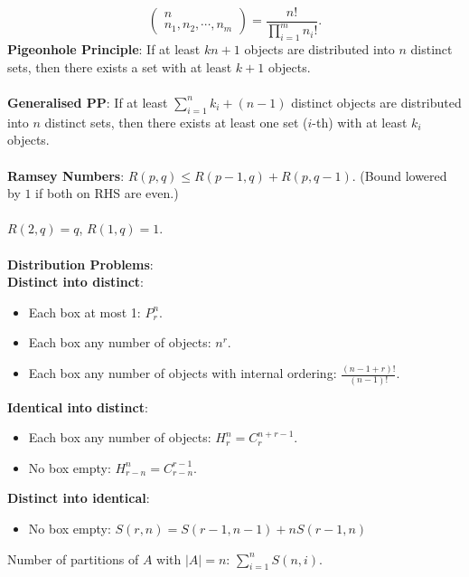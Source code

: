 \documentclass[11pt]{article}
\begin{document}
\begin{multicols*}{3}
\begin{equation*}
\begin{pmatrix}
                n \\
                n_1, n_2, \cdots, n_m
            \end{pmatrix} = \frac{n!}{\prod_{i = 1}^{m}n_i!}.
        \end{equation*}
        \textbf{Pigeonhole Principle}: If at least $kn + 1$ objects are distributed into $n$ distinct sets, then there exists a set with at least $k + 1$ objects.
        \\\\
        \textbf{Generalised PP}: If at least $\sum_{i = 1}^{n}k_i + (n - 1)$ distinct objects are distributed into $n$ distinct sets, then there exists at least one set ($i$-th) with at least $k_i$ objects.
        \\\\
        \textbf{Ramsey Numbers}: $R(p, q) \leq R(p - 1, q) + R(p, q - 1)$. (Bound lowered by $1$ if both on RHS are even.)
        \\\\
        $R(2, q) = q$, $R(1, q) = 1$.
        \\\\
        \textbf{Distribution Problems}:
        \\
        \textbf{Distinct into distinct}:
        \begin{itemize}
            \item Each box at most 1: $P^n_r$.
            \item Each box any number of objects: $n^r$.
            \item Each box any number of objects with internal ordering: $\frac{(n - 1 + r)!}{(n - 1)!}$.
        \end{itemize}
        \textbf{Identical into distinct}: 
        \begin{itemize}
            \item Each box any number of objects: $H^n_r = C^{n + r - 1}_r$.
            \item No box empty: $H^n_{r - n} = C^{r - 1}_{r - n}$.
        \end{itemize}
        \textbf{Distinct into identical}:
        \begin{itemize}
            \item No box empty: $S(r, n) = S(r - 1, n - 1) + nS(r - 1, n)$
        \end{itemize}
        Number of partitions of $A$ with $\left\lvert A \right\rvert = n$: $\sum_{i = 1}^{n}S(n, i)$.
        \\\\

\end{multicols*}
\end{document}
